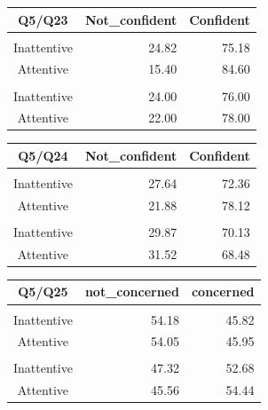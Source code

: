 \documentclass[
  11pt,
  a4paper,
]{article}
\begin{document}
\begingroup
\fontsize{12.0pt}{14.4pt}\selectfont
\begin{longtable*}{crr}
\toprule
Q5/Q23 & Not\_confident & Confident \\ 
\midrule\addlinespace[2.5pt]
 \\[2.5pt] 
\midrule\addlinespace[2.5pt]
Inattentive & 24.82 & 75.18 \\ 
Attentive & 15.40 & 84.60 \\ 
\midrule\addlinespace[2.5pt]
 \\[2.5pt] 
\midrule\addlinespace[2.5pt]
Inattentive & 24.00 & 76.00 \\ 
Attentive & 22.00 & 78.00 \\ 
\bottomrule
\end{longtable*}
\endgroup

\begingroup
\fontsize{12.0pt}{14.4pt}\selectfont
\begin{longtable*}{crr}
\toprule
Q5/Q24 & Not\_confident & Confident \\ 
\midrule\addlinespace[2.5pt]
 \\[2.5pt] 
\midrule\addlinespace[2.5pt]
Inattentive & 27.64 & 72.36 \\ 
Attentive & 21.88 & 78.12 \\ 
\midrule\addlinespace[2.5pt]
 \\[2.5pt] 
\midrule\addlinespace[2.5pt]
Inattentive & 29.87 & 70.13 \\ 
Attentive & 31.52 & 68.48 \\ 
\bottomrule
\end{longtable*}
\endgroup

\begingroup
\fontsize{12.0pt}{14.4pt}\selectfont
\begin{longtable*}{crr}
\toprule
Q5/Q25 & not\_concerned & concerned \\ 
\midrule\addlinespace[2.5pt]
 \\[2.5pt] 
\midrule\addlinespace[2.5pt]
Inattentive & 54.18 & 45.82 \\ 
Attentive & 54.05 & 45.95 \\ 
\midrule\addlinespace[2.5pt]
 \\[2.5pt] 
\midrule\addlinespace[2.5pt]
Inattentive & 47.32 & 52.68 \\ 
Attentive & 45.56 & 54.44 \\ 
\bottomrule
\end{longtable*}
\endgroup
\end{document}
